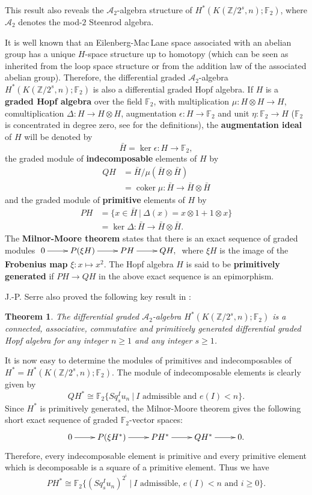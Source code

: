 \documentclass{conm-p-l}
\newtheorem{thm}{Theorem}[section]
\theoremstyle{definition}
\DeclareMathOperator{\coker}{coker}
\newcommand{\Z}{\mathbb{Z}}
\newcommand{\F}{\mathbb{F}}
\newcommand{\A}{\mathcal{A}}
\renewcommand{\geq}{\geqslant}
\begin{document}
This result also reveals the $\A_2$-algebra structure of $H^*(K(\Z/2^s,n);\F_2)$, where $\A_2$ denotes the mod-$2$ Steenrod algebra. 

It is well known that an Eilenberg-Mac\,Lane space associated with an abelian group has a unique ${H}$-space structure up to homotopy (which can be seen as inherited from the loop space structure or from the addition law of the associated abelian group). Therefore, the differential graded $\A_2$-algebra $H^*(K(\Z/2^s,n);\F_2)$ is also a differential graded Hopf algebra. If $H$ is a {\bf graded Hopf algebra} over the field $\F_2$, with multiplication $\mu:H\otimes H\to H$, comultiplication $\Delta:H\to H\otimes H$, augmentation $\epsilon:H\to\F_2$ and unit $\eta:\F_2\to H$ ($\F_2$ is concentrated in degree zero, see \cite{MM65} for the definitions), the {\bf augmentation ideal} of $H$ will be denoted by
$$
\bar{H}=\ker\epsilon:H\to\F_2,
$$ the graded module of {\bf indecomposable} elements of $H$ by
\begin{align*}
QH&=\bar{H}/\mu(\bar{H}\otimes\bar{H})\\
&=\coker \mu:\bar{H}\to\bar{H}\otimes\bar{H}
\end{align*}
and the graded module of {\bf primitive} elements of $H$ by
\begin{align*}
PH&=\{x\in\bar{H}\ |\ \Delta(x)=x\otimes1+1\otimes x\}\\
&=\ker \Delta:\bar{H}\to\bar{H}\otimes\bar{H}.
\end{align*}  
The {\bf Milnor-Moore theorem}\label{t:Milnor-Moore} states that there is an exact sequence of graded modules
$\xymatrix{
0\ar[r] &P(\xi H)\ar[r] &PH\ar[r] &QH,
}$ where $\xi H$ is the image of the {\bf Frobenius map} $\xi:x\mapsto x^2$. The Hopf algebra $H$ is said to be {\bf primitively generated} if $PH\to QH$ in the above exact sequence is an epimorphism.

\medskip
J.-P. Serre also proved the following key result in \cite{Se53}:

\begin{thm}
The differential graded $\A_2$-algebra $H^*(K(\Z/2^s,n);\F_2)$ is a connected, associative, commutative and primitively generated differential graded Hopf algebra for any integer $n\geq1$ and any integer $s\geq1$.
\end{thm}

It is now easy to determine the modules of primitives and indecomposables of $H^*=H^*(K(\Z/2^s,n);\F_2)$. The module of indecomposable elements is clearly given by
$$
QH^*\cong\F_2\{Sq^I_s u_n\ |\ \text{$I$ admissible and $e(I)<n$}\}.
$$
Since $H^*$ is primitively generated, the Milnor-Moore theorem gives the following short exact sequence of graded $\F_2$-vector spaces:
$$\xymatrix{
0\ar[r] &P(\xi H^*)\ar[r] &PH^*\ar[r] &QH^*\ar[r] &0.
}$$ Therefore, every indecomposable element is primitive and every primitive element which is decomposable is a square of a primitive element. Thus we have
$$
PH^*\cong\F_2\{(Sq^I_s u_n)^{2^i}\ |\ \text{$I$ admissible, $e(I)<n$ and $i\geq0$}\}.
$$
\end{document}
